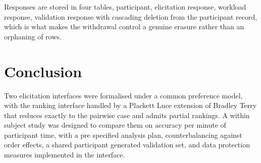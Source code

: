 \documentclass[11pt]{article}
\begin{document}
Responses are stored in four tables, participant, elicitation response, workload response, validation response with cascading deletion from the participant record, which is what makes the withdrawal control a genuine erasure rather than an orphaning of rows.


\section{Conclusion}
Two elicitation interfaces were formalised under a common preference model, with the ranking interface handled by a Plackett Luce extension of Bradley Terry that reduces exactly to the pairwise case and admits partial rankings. A within subject study was designed to compare them on accuracy per minute of participant time, with a pre specified analysis plan, counterbalancing against order effects, a shared participant generated validation set, and data protection measures implemented in the interface.
\end{document}
